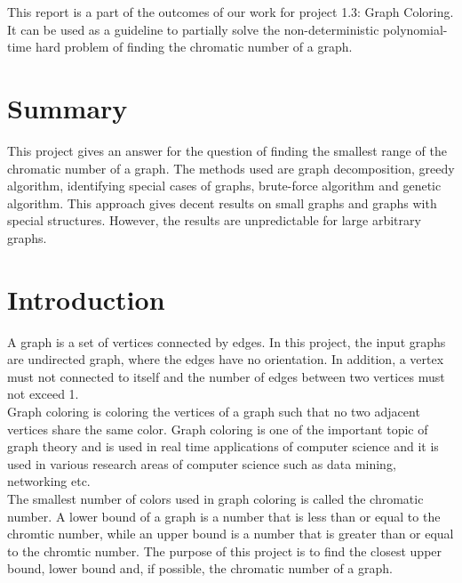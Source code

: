 \documentclass[a4paper]{report}
\begin{document}
	This report is a part of the outcomes of our work for project 1.3: Graph Coloring. It can be used as a guideline to partially solve the non-deterministic polynomial-time hard problem of finding the chromatic number of a graph.
	
	
	\chapter*{Summary}
	This project gives an answer for the question of finding the smallest range of the chromatic number of a graph. The methods used are graph decomposition, greedy algorithm, identifying special cases of graphs, brute-force algorithm and genetic algorithm. This approach gives decent results on small graphs and graphs with special structures. However, the results are unpredictable for large arbitrary graphs.
	
	\tableofcontents
	

	
	\chapter{Introduction}
	
	A graph is a set of vertices connected by edges. In this project, the input graphs are undirected graph, where the edges have no orientation. In addition, a vertex must not connected to itself and the number of edges between two vertices must not exceed 1. \\
	
	Graph coloring is coloring the vertices of a graph such that no two adjacent vertices share the same color. Graph coloring is one of the important topic of graph theory and is used in real time applications of computer science and it is used in various research areas of computer science such as data mining, networking etc.\\
	
	The smallest number of colors used in graph coloring is called the chromatic number. A lower bound of a graph is a number that is less than or equal to the chromtic number, while an upper bound is a number that is greater than or equal to the chromtic number. The purpose of this project is to find the closest upper bound, lower bound and, if possible, the chromatic number of a graph.\\
	
\end{document}
